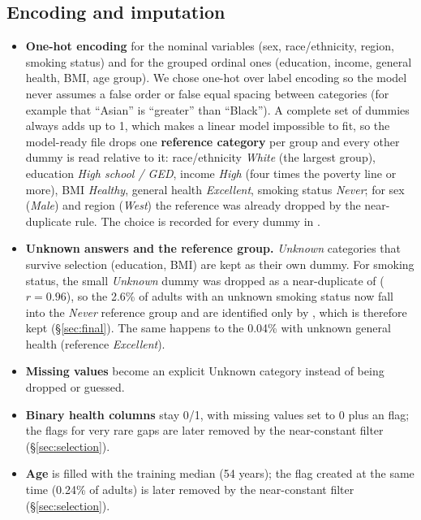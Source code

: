 \subsection{Encoding and imputation}\label{sec:encoding}

\begin{itemize}
  \item \textbf{One-hot encoding} for the nominal variables (sex, race/ethnicity, region, smoking status) and for the grouped ordinal ones (education, income, general health, BMI, age group). We chose one-hot over label encoding so the model never assumes a false order or false equal spacing between categories (for example that ``Asian'' is ``greater'' than ``Black''). A complete set of dummies always adds up to 1, which makes a linear model impossible to fit, so the model-ready file drops one \textbf{reference category} per group and every other dummy is read relative to it: race/ethnicity \emph{White} (the largest group), education \emph{High school / GED}, income \emph{High} (four times the poverty line or more), BMI \emph{Healthy}, general health \emph{Excellent}, smoking status \emph{Never}; for sex (\emph{Male}) and region (\emph{West}) the reference was already dropped by the near-duplicate rule. The choice is recorded for every dummy in .
  \item \textbf{Unknown answers and the reference group.} \emph{Unknown} categories that survive selection (education, BMI) are kept as their own dummy. For smoking status, the small \emph{Unknown} dummy was dropped as a near-duplicate of  ($r = 0.96$), so the 2.6\% of adults with an unknown smoking status now fall into the \emph{Never} reference group and are identified only by , which is therefore kept (\S\ref{sec:final}). The same happens to the 0.04\% with unknown general health (reference \emph{Excellent}).
  \item \textbf{Missing values} become an explicit Unknown category instead of being dropped or guessed.
  \item \textbf{Binary health columns} stay 0/1, with missing values set to 0 plus an  flag; the flags for very rare gaps are later removed by the near-constant filter (\S\ref{sec:selection}).
  \item \textbf{Age} is filled with the training median (54 years); the  flag created at the same time (0.24\% of adults) is later removed by the near-constant filter (\S\ref{sec:selection}).
\end{itemize}

